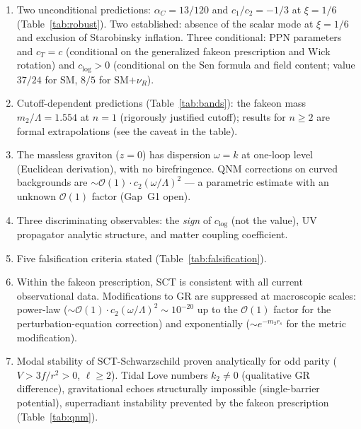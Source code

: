\documentclass[12pt,a4paper]{article}
\theoremstyle{plain}
\theoremstyle{definition}
\theoremstyle{remark}
\newcommand{\order}{\mathcal{O}}
\begin{document}
\begin{enumerate}[(1)]
\item Two unconditional predictions: $\alpha_C = 13/120$ and
  $c_1/c_2 = -1/3$ at $\xi = 1/6$
  (Table~\ref{tab:robust}).  Two established: absence of the
  scalar mode at $\xi = 1/6$ and exclusion of Starobinsky
  inflation.  Three conditional: PPN parameters and $c_T = c$
  (conditional on the generalized fakeon prescription and Wick
  rotation) and $c_{\log} > 0$ (conditional on the Sen formula
  and field content; value $37/24$ for SM, $8/5$ for
  SM$+\nu_R$).

\item Cutoff-dependent predictions
  (Table~\ref{tab:bands}): the fakeon mass
  $m_2/\Lambda = 1.554$ at $n = 1$ (rigorously justified
  cutoff); results for $n \geq 2$ are formal extrapolations
  (see the caveat in the table).

\item The massless graviton ($z = 0$) has dispersion
  $\omega = k$ at one-loop level (Euclidean derivation), with
  no birefringence.  QNM corrections on curved backgrounds are
  $\sim \order(1) \cdot c_2(\omega/\Lambda)^2$ --- a parametric
  estimate with an unknown $\order(1)$ factor (Gap~G1 open).

\item Three discriminating observables: the \emph{sign} of
  $c_{\log}$ (not the value), UV propagator analytic structure,
  and matter coupling coefficient.

\item Five falsification criteria stated
  (Table~\ref{tab:falsification}).

\item Within the fakeon prescription, SCT is consistent with all
  current observational data.  Modifications to GR are suppressed
  at macroscopic scales:
  power-law ($\sim \order(1) \cdot c_2(\omega/\Lambda)^2
  \sim 10^{-20}$ up to the $\order(1)$ factor for the
  perturbation-equation correction) and exponentially
  ($\sim e^{-m_2 r_s}$ for the metric modification).

\item Modal stability of SCT-Schwarzschild proven analytically
  for odd parity ($V > 3f/r^2 > 0$, $\ell \geq 2$).  Tidal
  Love numbers $k_2 \neq 0$ (qualitative GR difference),
  gravitational echoes structurally impossible (single-barrier
  potential), superradiant instability prevented by the fakeon
  prescription (Table~\ref{tab:qnm}).
\end{enumerate}
\end{document}
